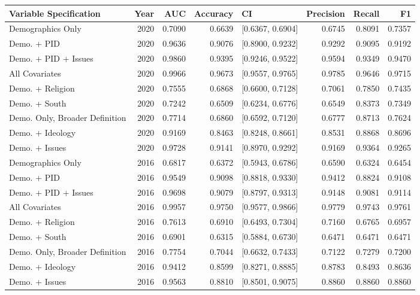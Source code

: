 \begin{longtable}{lrrrlrrr}
  \toprule
Variable Specification & Year & AUC & Accuracy & CI & Precision & Recall & F1 \\ 
  \midrule
Demographics Only & 2020 & 0.7090 & 0.6639 & [0.6367, 0.6904] & 0.6745 & 0.8091 & 0.7357 \\ 
  Demo. + PID & 2020 & 0.9636 & 0.9076 & [0.8900, 0.9232] & 0.9292 & 0.9095 & 0.9192 \\ 
  Demo. + PID + Issues & 2020 & 0.9860 & 0.9395 & [0.9246, 0.9522] & 0.9594 & 0.9349 & 0.9470 \\ 
  All Covariates & 2020 & 0.9966 & 0.9673 & [0.9557, 0.9765] & 0.9785 & 0.9646 & 0.9715 \\ 
  Demo. + Religion & 2020 & 0.7555 & 0.6868 & [0.6600, 0.7128] & 0.7061 & 0.7850 & 0.7435 \\ 
  Demo. + South & 2020 & 0.7242 & 0.6509 & [0.6234, 0.6776] & 0.6549 & 0.8373 & 0.7349 \\ 
  Demo. Only, Broader Definition & 2020 & 0.7714 & 0.6860 & [0.6592, 0.7120] & 0.6777 & 0.8713 & 0.7624 \\ 
  Demo. + Ideology & 2020 & 0.9169 & 0.8463 & [0.8248, 0.8661] & 0.8531 & 0.8868 & 0.8696 \\ 
  Demo. + Issues & 2020 & 0.9728 & 0.9141 & [0.8970, 0.9292] & 0.9169 & 0.9364 & 0.9265 \\ 
  Demographics Only & 2016 & 0.6817 & 0.6372 & [0.5943, 0.6786] & 0.6590 & 0.6324 & 0.6454 \\ 
  Demo. + PID & 2016 & 0.9549 & 0.9098 & [0.8818, 0.9330] & 0.9412 & 0.8824 & 0.9108 \\ 
  Demo. + PID + Issues & 2016 & 0.9698 & 0.9079 & [0.8797, 0.9313] & 0.9148 & 0.9081 & 0.9114 \\ 
  All Covariates & 2016 & 0.9957 & 0.9750 & [0.9577, 0.9866] & 0.9779 & 0.9743 & 0.9761 \\ 
  Demo. + Religion & 2016 & 0.7613 & 0.6910 & [0.6493, 0.7304] & 0.7160 & 0.6765 & 0.6957 \\ 
  Demo. + South & 2016 & 0.6901 & 0.6315 & [0.5884, 0.6730] & 0.6471 & 0.6471 & 0.6471 \\ 
  Demo. Only, Broader Definition & 2016 & 0.7754 & 0.7044 & [0.6632, 0.7433] & 0.7122 & 0.7279 & 0.7200 \\ 
  Demo. + Ideology & 2016 & 0.9412 & 0.8599 & [0.8271, 0.8885] & 0.8783 & 0.8493 & 0.8636 \\ 
  Demo. + Issues & 2016 & 0.9563 & 0.8810 & [0.8501, 0.9075] & 0.8860 & 0.8860 & 0.8860 \\ 

\end{longtable}
